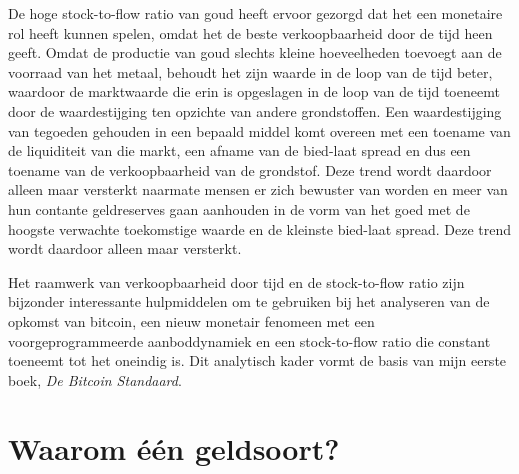 De hoge stock-to-flow ratio van goud heeft ervoor gezorgd dat het een monetaire rol heeft kunnen spelen, omdat het de beste verkoopbaarheid door de tijd heen geeft. Omdat de productie van goud slechts kleine hoeveelheden toevoegt aan de voorraad van het metaal, behoudt het zijn waarde in de loop van de tijd beter, waardoor de marktwaarde die erin is opgeslagen in de loop van de tijd toeneemt door de waardestijging ten opzichte van andere grondstoffen. Een waardestijging van tegoeden gehouden in een bepaald middel komt overeen met een toename van de liquiditeit van die markt, een afname van de bied-laat spread en dus een toename van de verkoopbaarheid van de grondstof. Deze trend wordt daardoor alleen maar versterkt naarmate mensen er zich bewuster van worden en meer van hun contante geldreserves gaan aanhouden in de vorm van het goed met de hoogste verwachte toekomstige waarde en de kleinste bied-laat spread. Deze trend wordt daardoor alleen maar versterkt.

Het raamwerk van verkoopbaarheid door tijd en de stock-to-flow ratio zijn bijzonder interessante hulpmiddelen om te gebruiken bij het analyseren van de opkomst van bitcoin, een nieuw monetair fenomeen met een voorgeprogrammeerde aanboddynamiek en een stock-to-flow ratio die constant toeneemt tot het oneindig is. Dit analytisch kader vormt de basis van mijn eerste boek, \emph{De Bitcoin Standaard}.

\vspace{-1em}
\hypertarget{waarom-euxe9n-geldsoort}{%
\section{Waarom één geldsoort?}\label{waarom-euxe9n-geldsoort}}

